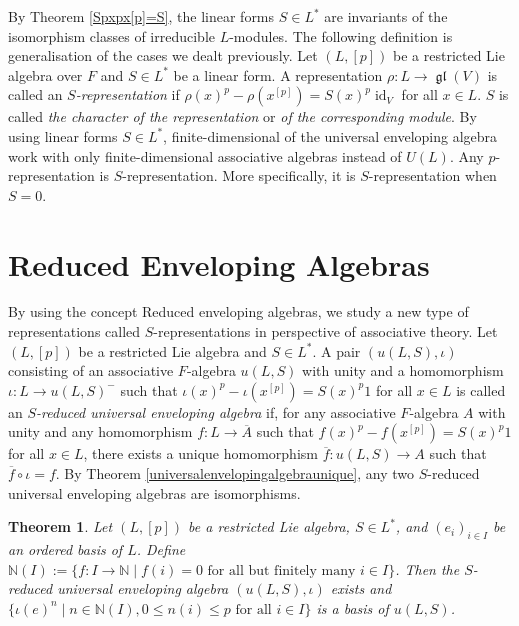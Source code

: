 \documentclass[12pt,MSc]{muthesis_2023}
\theoremstyle{plain}%
\newtheorem{Theorem}[FactCounter]{Theorem} %
\theoremstyle{definition}
\theoremstyle{remark}
\DeclareMathOperator{\gl}{\mathfrak{gl}}
\DeclareMathOperator{\id}{id}
\begin{document}
By Theorem \ref{Spxpx[p]=S}, the linear forms $S\in L^*$ are invariants of the isomorphism classes of irreducible $L$-modules. The following definition is generalisation of the cases we dealt previously. Let $(L,[p])$ be a restricted Lie algebra over $F$ and $S\in L^*$ be a linear form. A representation $\rho:L\rightarrow \gl(V)$ is called an \textit{$S$-representation} if ${\rho(x)}^p-\rho(x^{[p]})={S(x)}^p \id_V$ for all $x\in L$. $S$ is called \textit{the character of the representation} or \textit{of the corresponding module}. By using linear forms $S \in L^*$, finite-dimensional of the universal enveloping algebra work with only finite-dimensional associative algebras instead of $U(L)$. Any $p$-representation is $S$-representation. More specifically, it is $S$-representation when $S=0$.


\section{Reduced Enveloping Algebras} 

By using the concept Reduced enveloping algebras, we study a new type of representations called $S$-representations in perspective of associative theory. Let $(L, [p])$ be a restricted Lie algebra and $S\in L^*$. A pair $(u(L,S), \iota)$ consisting of an associative $F$-algebra $u(L,S)$ with unity and a homomorphism $\iota: L \rightarrow u(L,S)^-$ such that ${\iota(x)}^p-\iota(x^{[p]})=S(x)^p1$ for all $x\in L$ is called an \textit{$S$-reduced universal enveloping algebra} if, for any associative $F$-algebra $A$ with unity and any homomorphism $f:L \rightarrow \overline{A}$ such that ${f(x)}^p-f(x^{[p]})={S(x)}^p1$ for all $x\in L$, there exists a unique homomorphism $\overline{f}: u(L,S) \rightarrow A$ such that $\overline{f}\circ \iota=f$. By Theorem \ref{universalenvelopingalgebraunique}, any two $S$-reduced universal enveloping algebras are isomorphisms.

\begin{Theorem}\label{existSredunienvalganditsbasis}
Let $(L, [p])$ be a restricted Lie algebra, $S\in L^*$, and $(e_i)_{i\in I}$ be an ordered basis of $L$. Define $\mathbb{N}(I):= \{f: I\rightarrow \mathbb{N} \mid f(i)=0 \text{   for all but finitely many }i\in I\}$. Then the $S$-reduced universal enveloping algebra $(u(L,S), \iota)$ exists and $\{{\iota(e)}^n\mid n\in \mathbb{N}(I), 0 \leq n(i) \leq p \text{ for all } i\in I\}$ is a basis of $u(L,S)$.
\end{Theorem}
\end{document}
